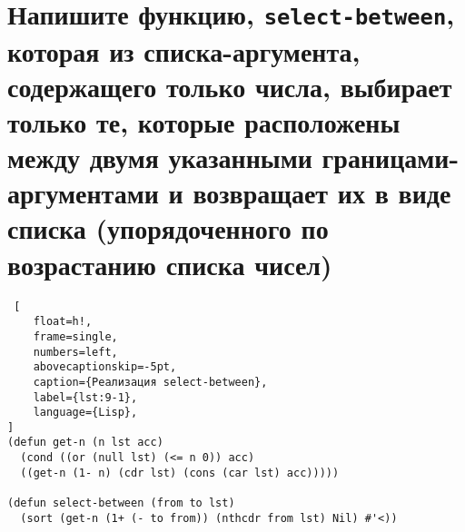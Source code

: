 \section{Напишите функцию, \texttt{select-between}, которая из списка-аргумента, содержащего только числа, выбирает только те, которые расположены между двумя указанными границами-аргументами и возвращает их в виде списка (упорядоченного по возрастанию списка чисел)}

\begin{lstlisting} [
	float=h!,
	frame=single,
	numbers=left,
	abovecaptionskip=-5pt,
	caption={Реализация select-between},
	label={lst:9-1},
	language={Lisp},
]
(defun get-n (n lst acc)
  (cond ((or (null lst) (<= n 0)) acc)
  ((get-n (1- n) (cdr lst) (cons (car lst) acc)))))

(defun select-between (from to lst)
  (sort (get-n (1+ (- to from)) (nthcdr from lst) Nil) #'<))
\end{lstlisting}